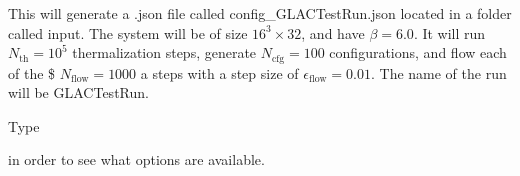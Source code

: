 
\begin{DoxyCode}{0}
\end{DoxyCode}
 This will generate a .json file called {\ttfamily config\+\_\+\+G\+L\+A\+C\+Test\+Run.\+json} located in a folder called {\ttfamily input}. The system will be of size $ 16^3 \times 32$, and have $\beta = 6.0$. It will run $N_\mathrm{th} = 10^5$ thermalization steps, generate $N_\mathrm{cfg} = 100$ configurations, and flow each of the \$ $N_\mathrm{flow} = 1000$ a steps with a step size of $\epsilon_\mathrm{flow} = 0.01$. The name of the run will be G\+L\+A\+C\+Test\+Run.

Type 
\begin{DoxyCode}{0}
\end{DoxyCode}
 in order to see what options are available. 